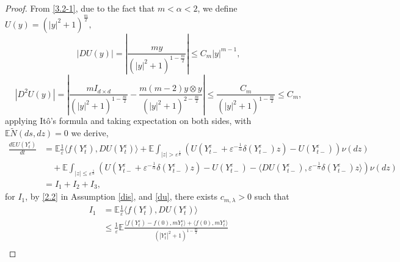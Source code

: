 \documentclass[11pt,reqno]{amsart}
\numberwithin{equation}{section}
\begin{document}
\begin{proof}
	From \eqref{3.2-1},
	due to the fact that $m<\alpha<2$,
	 we define   
$
				U(y)=(|y|^{2}+1)^{\frac{m}{2}},
$
	\begin{equation}\label{du}
			 |DU(y)|=\left|  \frac{my}{(|y|^{2}+1)^{1-\frac{m}{2}}}\right|\leq C_{m} |y|^{m-1},
	\end{equation}
	\begin{equation}\label{d2u}
			|D^{2}U(y)|=\left|   \frac{mI_{d\times d }}{(|y|^{2}+1)^{1-\frac{m}{2}}}-\frac{m(m-2)y\otimes y}{(|y|^{2}+1)^{2-\frac{m}{2}}} \right|\leq \frac{C_{m}}{(|y|^{2}+1)^{1-\frac{m}{2}}}\leq C_{m},
	\end{equation}
	applying It\^{o}'s formula and taking expectation on both sides, with $\mathbb{E}\tilde{N}(ds,dz)=0$ we derive,
	\begin{align*}
	\frac{d\mathbb{E}U(Y_{t}^{\varepsilon})}{dt}&=\mathbb{E} \frac{1}{\varepsilon}\langle  f(Y_{t}^{\varepsilon}),DU(Y_{t}^{\varepsilon})\rangle +\mathbb{E} \int_{|z|> \varepsilon^{\frac{1}{\alpha}}}\left( U(Y_{t-}^{\varepsilon}+\varepsilon^{-\frac{1}{\alpha}}\delta(Y_{t-}^\varepsilon) z)-U(Y_{t-}^{\varepsilon}) \right) \nu(dz) \\
		&\quad+\mathbb{E} \int_{|z|\leq \varepsilon^{\frac{1}{\alpha}}}\left( U(Y_{t-}^{\varepsilon}+\varepsilon^{-\frac{1}{\alpha}}\delta(Y_{t-}^\varepsilon) z)-U(Y_{t-}^{\varepsilon})-\langle  DU(Y_{t-}^{\varepsilon}), \varepsilon^{-\frac{1}{\alpha}}\delta(Y_{t-}^\varepsilon) z\rangle  \right) \nu(dz)\\
		&=I_{1}+I_{2}+I_{3},
	\end{align*}
for $I_{1}$, by  \eqref{2.2} in Assumption \ref{dis}, and \eqref{du}, there exists $ c_{m,\lambda}>0$ such that
\begin{align*}
I_{1}&=\mathbb{E} \frac{1}{\varepsilon}\langle  f(Y_{t}^{\varepsilon}),DU(Y_{t}^{\varepsilon})\rangle \\
& \leq\frac{1}{\varepsilon} \mathbb{E}  \frac{\langle  f(Y_{t}^{\varepsilon})-f(0),mY_{t}^{\varepsilon}\rangle  +\langle  f(0),mY_{t}^{\varepsilon}\rangle }{(|Y_{t}^{\varepsilon}|^{2}+1)^{1-\frac{m}{2}}}\\

\end{align*}
\end{proof}
\end{document}
